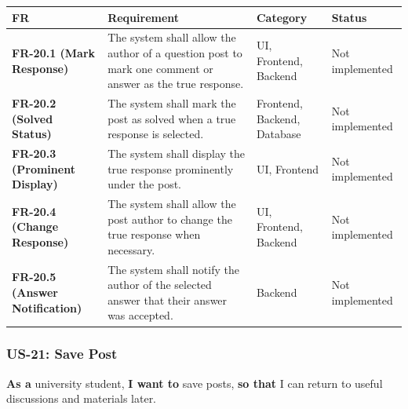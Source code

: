 \documentclass[12pt]{article}
\renewcommand{\baselinestretch}{1.5}
\begin{document}
\begingroup
\small
\renewcommand{\baselinestretch}{1.0}\selectfont
\renewcommand{\arraystretch}{1.15}
\setlength{\tabcolsep}{6pt}
\begin{longtable}{|>{\raggedright\arraybackslash}p{}|>{\raggedright\arraybackslash}p{}|>{\raggedright\arraybackslash}p{}|>{\raggedright\arraybackslash}p{}|}
\hline
\textbf{FR} & \textbf{Requirement} & \textbf{Category} & \textbf{Status} \\ \hline
\endhead
\textbf{FR-20.1 (Mark Response)} & The system shall allow the author of a question post to mark one comment or answer as the true response. & UI, Frontend, Backend & Not implemented \\ \hline
\textbf{FR-20.2 (Solved Status)} & The system shall mark the post as solved when a true response is selected. & Frontend, Backend, Database & Not implemented \\ \hline
\textbf{FR-20.3 (Prominent Display)} & The system shall display the true response prominently under the post. & UI, Frontend & Not implemented \\ \hline
\textbf{FR-20.4 (Change Response)} & The system shall allow the post author to change the true response when necessary. & UI, Frontend, Backend & Not implemented \\ \hline
\textbf{FR-20.5 (Answer Notification)} & The system shall notify the author of the selected answer that their answer was accepted. & Backend & Not implemented \\ \hline
\end{longtable}
\endgroup
\par\medskip

\hypertarget{sec:us-21-save-post}{}
\subsubsection*{US-21: Save Post}
\par\medskip

\textbf{As a} university student, \textbf{I want to} save posts, \textbf{so that} I can return to useful discussions and materials later.
\par\medskip
\end{document}
